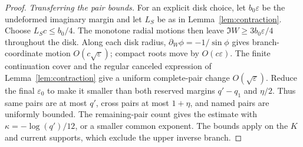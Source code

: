 \documentclass[11pt]{article}
\numberwithin{equation}{section}
\theoremstyle{definition}
\newcommand{\eps}{\varepsilon}
\begin{document}
\begin{proof}
\smallskip\noindent\textit{Transferring the pair bounds.}
For an explicit disk choice, let \(b_0\eps\) be the
undeformed imaginary margin and let \(L_S\) be as in
Lemma~\ref{lem:contraction}. Choose \(L_Sc\le b_0/4\).
The monotone radial motions then leave \(\Im W\ge3b_0\eps/4\)
throughout the disk. Along each disk radius,
\(\partial_W\phi=-1/\sin\phi\) gives branch-coordinate motion
\(O(c\sqrt\eps)\); compact roots move by \(O(c\eps)\).
The finite continuation cover and the regular canceled expression
of Lemma~\ref{lem:contraction} give a uniform complete-pair change
\(O(\sqrt\eps)\). Reduce the final \(\eps_0\) to make it
smaller than both reserved margins \(q'-q_1\) and \(\eta/2\).
Thus same pairs are at most \(q'\), cross pairs at most
\(1+\eta\), and named pairs are uniformly bounded.
The remaining-pair count gives the estimate with
\(\kappa=-\log(q')/12\), or a smaller common exponent. The bounds
apply on the \(K\) and current supports, which exclude the upper
inverse branch.
\end{proof}
\end{document}
